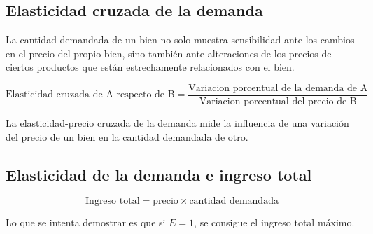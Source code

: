 \subsection{Elasticidad cruzada de la demanda}

La cantidad demandada de un bien no solo muestra sensibilidad ante los cambios en el precio del propio bien,
sino también ante alteraciones de los precios de ciertos productos que están estrechamente relacionados con el bien.

\begin{equation*}
    \text{Elasticidad cruzada de A respecto de B} = \frac{\text{Variacion porcentual de la demanda de A}}{\text{Variacion porcentual del precio de B}}
\end{equation*}

La elasticidad-precio cruzada de la demanda mide la influencia de una variación del precio de un bien en la cantidad demandada de otro.

\subsection{Elasticidad de la demanda e ingreso total}

\begin{equation*}
    \text{Ingreso total} = \text{precio} \times \text{cantidad demandada}
\end{equation*}

Lo que se intenta demostrar es que si \(E = 1\),
se consigue el ingreso total máximo.

